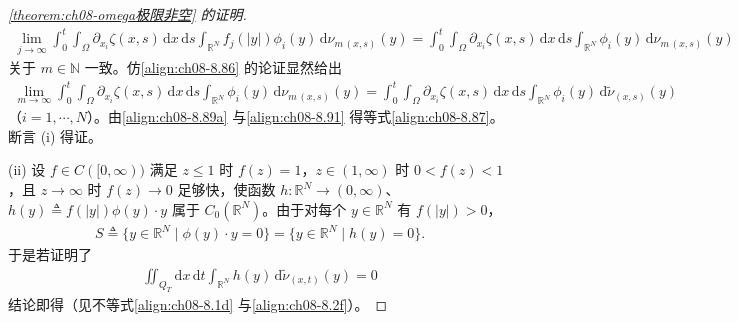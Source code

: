 \documentclass[../../main.tex]{subfiles}%
\begin{document}
\begin{proof}[\cref{theorem:ch08-omega极限非空} 的证明]
\begin{align}
\lim_{j\to\infty}\int_0^t\int_\Omega\partial_{x_i}\zeta(x,s)\,\mathrm{d}x\,\mathrm{d}s\int_{\mathbb{R}^N}f_j(|y|)\phi_i(y)\,\mathrm{d}\nu_{m\,(x,s)}(y)
=\int_0^t\int_\Omega\partial_{x_i}\zeta(x,s)\,\mathrm{d}x\,\mathrm{d}s\int_{\mathbb{R}^N}\phi_i(y)\,\mathrm{d}\nu_{m\,(x,s)}(y) \label{align:ch08-8.90}
\end{align}
关于 $m\in\mathbb{N}$ 一致。仿\eqref{align:ch08-8.86} 的论证显然给出
\begin{align}
\lim_{m\to\infty}\int_0^t\int_\Omega\partial_{x_i}\zeta(x,s)\,\mathrm{d}x\,\mathrm{d}s\int_{\mathbb{R}^N}\phi_i(y)\,\mathrm{d}\nu_{m\,(x,s)}(y)
=\int_0^t\int_\Omega\partial_{x_i}\zeta(x,s)\,\mathrm{d}x\,\mathrm{d}s\int_{\mathbb{R}^N}\phi_i(y)\,\mathrm{d}\tilde\nu_{(x,s)}(y) \label{align:ch08-8.91}
\end{align}
（$i=1,\cdots ,N$）。由\eqref{align:ch08-8.89a} 与\eqref{align:ch08-8.91} 得等式\eqref{align:ch08-8.87}。断言 (i) 得证。

(ii) 设 $f\in C([0,\infty))$ 满足 $z\leqslant1$ 时 $f(z)=1$，$z\in(1,\infty)$ 时 $0<f(z)<1$，且 $z\to\infty$ 时 $f(z)\to0$ 足够快，使函数 $h:\mathbb{R}^N\to(0,\infty)$、$h(y)\triangleq f(|y|)\phi(y)\cdot y$ 属于 $C_0(\mathbb{R}^N)$。由于对每个 $y\in\mathbb{R}^N$ 有 $f(|y|)>0$，
\begin{align*}
S\triangleq \{y\in\mathbb{R}^N\mid\phi(y)\cdot y=0\}=\{y\in\mathbb{R}^N\mid h(y)=0\}.
\end{align*}
于是若证明了
\begin{align}
\iint_{Q_T}\mathrm{d}x\,\mathrm{d}t\int_{\mathbb{R}^N}h(y)\,\mathrm{d}\tilde\nu_{(x,t)}(y)=0 \label{align:ch08-8.92}
\end{align}
结论即得（见不等式\eqref{align:ch08-8.1d} 与\eqref{align:ch08-8.2f}）。


\end{proof}
\end{document}
